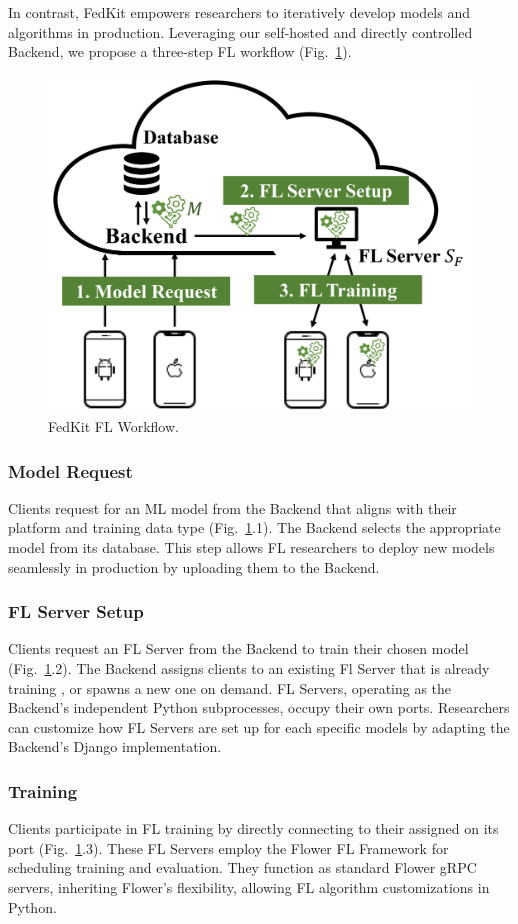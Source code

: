 \documentclass[letterpaper]{article} %
\begin{document}
In contrast,
FedKit empowers researchers to iteratively develop models and algorithms
in production.
Leveraging our self-hosted and directly controlled Backend,
we propose a three-step FL workflow
(Fig.~\ref{fig:fl-workflow}).
\begin{figure}
    \centering
    \includegraphics*[width=0.8\linewidth]{fl_workflow.pdf}
    \caption{FedKit FL Workflow.}
    \label{fig:fl-workflow}
\end{figure}

\subsubsection{Model Request}
Clients request for an ML model from the Backend that
aligns with their platform and training data type
(Fig.~\ref{fig:fl-workflow}.1).
The Backend selects the appropriate model \model{} from its database.
This step allows FL researchers to deploy new models seamlessly
in production by uploading them to the Backend.

\subsubsection{FL Server Setup}
Clients request an FL Server from the Backend to
train their chosen model \model{}
(Fig.~\ref{fig:fl-workflow}.2).
The Backend assigns clients to an existing Fl Server \fs{} that
is already training \model{},
or spawns a new one on demand.
FL Servers, operating as the Backend's independent Python subprocesses,
occupy their own ports.
Researchers can customize how FL Servers are set up for each specific models by
adapting the Backend's Django implementation.

\subsubsection{Training}
Clients participate in FL training by directly connecting to
their assigned \fs{} on its port
(Fig.~\ref{fig:fl-workflow}.3).
These FL Servers employ the Flower FL Framework for
scheduling training and evaluation.
They function as standard Flower gRPC servers,
inheriting Flower's flexibility,
allowing FL algorithm customizations in Python.
\end{document}
